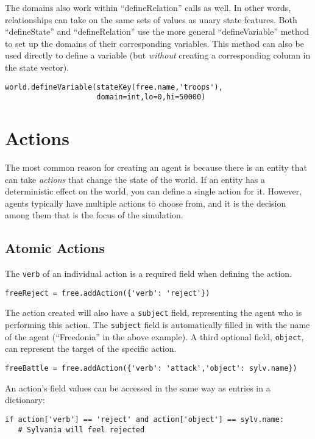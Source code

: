 \documentclass{article}
\begin{document}
The domains also work within ``defineRelation'' calls as well. In other words, relationships can take on the same sets of values as unary state features. Both ``defineState'' and ``defineRelation'' use the more general ``defineVariable'' method to set up the domains of their corresponding variables. This method can also be used directly to define a variable (but {\em without} creating a corresponding column in the state vector).

\begin{verbatim}
world.defineVariable(stateKey(free.name,'troops'),
                     domain=int,lo=0,hi=50000)
\end{verbatim}

\section{Actions}\label{sec:actions}
The most common reason for creating an agent is because there is an entity that can take {\em actions} that change the state of the world. If an entity has a deterministic effect on the world, you can define a single action for it. However, agents typically have multiple actions to choose from, and it is the decision among them that is the focus of the simulation.

\subsection{Atomic Actions}

The {\tt verb} of an individual action is a required field when defining the action. 

\begin{verbatim}
freeReject = free.addAction({'verb': 'reject'})
\end{verbatim}

The action created will also have a {\tt subject} field, representing the agent who is performing this action. The {\tt subject} field is automatically filled in with the name of the agent (``Freedonia'' in the above example). A third optional field, {\tt object}, can represent the target of the specific action.

\begin{verbatim}
freeBattle = free.addAction({'verb': 'attack','object': sylv.name})
\end{verbatim}

An action's field values can be accessed in the same way as entries in a dictionary:

\begin{verbatim}
if action['verb'] == 'reject' and action['object'] == sylv.name:
   # Sylvania will feel rejected
\end{verbatim}
\end{document}
